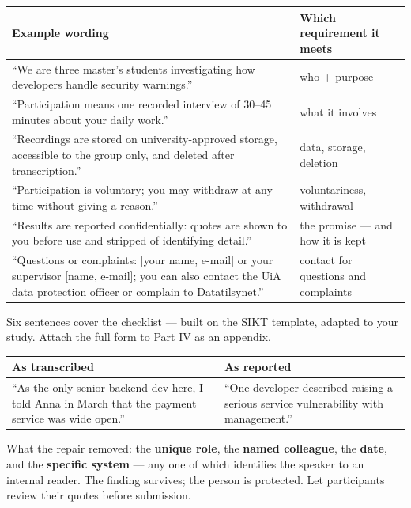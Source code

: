 \documentclass[11pt,a4paper,british,twoside=false,headings=small,chapterprefix=false,numbers=noenddot]{scrbook}
\begin{document}
\begin{center}\small
\footnotesize
  \renewcommand{\arraystretch}{1.35}
  \begin{tabular}{@{}p{7.6cm}p{5.2cm}@{}}
    \toprule
    \textbf{Example wording} & \textbf{Which requirement it meets}\\
    \midrule
    ``We are three master's students investigating how developers handle security warnings.'' & who + purpose\\
    ``Participation means one recorded interview of 30--45 minutes about your daily work.'' & what it involves\\
    ``Recordings are stored on university-approved storage, accessible to the group only, and deleted after transcription.'' & data, storage, deletion\\
    ``Participation is voluntary; you may withdraw at any time without giving a reason.'' & voluntariness, withdrawal\\
    ``Results are reported confidentially: quotes are shown to you before use and stripped of identifying detail.'' & the promise --- and how it is kept\\
    ``Questions or complaints: [your name, e-mail] or your supervisor [name, e-mail]; you can also contact the UiA data protection officer or complain to Datatilsynet.'' & contact for questions and complaints\\
    \bottomrule
  \end{tabular}
  

  Six sentences cover the checklist --- built on the SIKT template, adapted
  to your study. Attach the full form to Part IV as an appendix.
\end{center}

\begin{center}\small
\small
  \renewcommand{\arraystretch}{1.4}
  \begin{tabular}{@{}p{6.3cm}p{6.5cm}@{}}
    \toprule
    \textbf{As transcribed} & \textbf{As reported}\\
    \midrule
    ``As the only senior backend dev here, I told Anna in March that the
    payment service was wide open.'' & ``One developer described raising a
    serious service vulnerability with management.''\\
    \bottomrule
  \end{tabular}
  

  What the repair removed: the \textbf{unique role}, the \textbf{named
  colleague}, the \textbf{date}, and the \textbf{specific system} --- any one
  of which identifies the speaker to an internal reader. The finding
  survives; the person is protected. Let participants review their quotes
  before submission.
\end{center}
\end{document}
